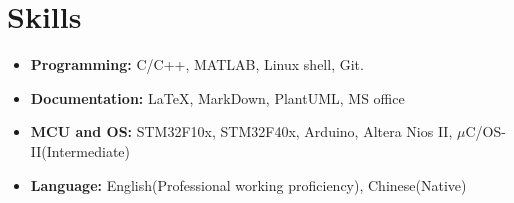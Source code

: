 \documentclass[12pt,a4paper,sans]{moderncv}        %
\begin{document}
\section{Skills}

\vspace{3pt}

\begin{itemize}

\item \textbf{Programming:} C/C++, MATLAB, Linux shell, Git.

\vspace{6pt}

\item \textbf{Documentation:} \LaTeX , MarkDown, PlantUML, MS office

\vspace{6pt}

\item \textbf{MCU and OS:}  STM32F10x, STM32F40x, Arduino, Altera Nios II, $\mu$C/OS-II(Intermediate)

\vspace{6pt}

\item \textbf{Language:} English(Professional working proficiency), Chinese(Native)

\vspace{6pt}

\end{itemize}



\nocite{*}



\end{document}

